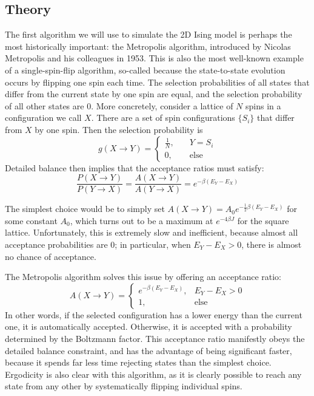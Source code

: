 \documentclass[twocolumn,aps,prl]{revtex4-1} %
\begin{document}
\subsection{Theory}
The first algorithm we will use to simulate the 2D Ising model is perhaps the most historically important: the Metropolis algorithm, introduced by Nicolas Metropolis and his colleagues in 1953. This is also the most well-known example of a single-spin-flip algorithm, so-called because the state-to-state evolution occurs by flipping one spin each time. The selection probabilities of all states that differ from the current state by one spin are equal, and the selection probability of all other states are 0. More concretely, consider a lattice of $N$ spins in a configuration we call $X$. There are a set of spin configurations $\{S_i\}$ that differ from $X$ by one spin. Then the selection probability is
\begin{equation}
g(X \to Y) = \begin{cases}
\frac{1}{N},& \quad Y = S_i \\
0,& \quad \text{else}
\end{cases}
\end{equation}
Detailed balance then implies that the acceptance ratios must satisfy:
\begin{equation}
\frac{P(X \to Y)}{P(Y \to X)} = \frac{A(X \to Y)}{A(Y \to X)} = e^{-\beta(E_Y - E_X)}
\end{equation}

The simplest choice would be to simply set $A(X \to Y) = A_0e^{-\frac{1}{2}\beta(E_Y - E_X)}$ for some constant $A_0$, which turns out to be a maximum at $e^{-4\beta J}$ for the square lattice. Unfortunately, this is extremely slow and inefficient, because almost all acceptance probabilities are 0; in particular, when $E_Y - E_X > 0$, there is almost no chance of acceptance. 

The Metropolis algorithm solves this issue by offering an acceptance ratio:
\begin{equation}
A(X \to Y) = \begin{cases}
e^{-\beta(E_Y - E_X)}, & E_Y - E_X > 0 \\
1, & \text{else}
\end{cases}
\end{equation}
In other words, if the selected configuration has a lower energy than the current one, it is automatically accepted. Otherwise, it is accepted with a probability determined by the Boltzmann factor. This acceptance ratio manifestly obeys the detailed balance constraint, and has the advantage of being significant faster, because it spends far less time rejecting states than the simplest choice. Ergodicity is also clear with this algorithm, as it is clearly possible to reach any state from any other by systematically flipping individual spins.
\end{document}
